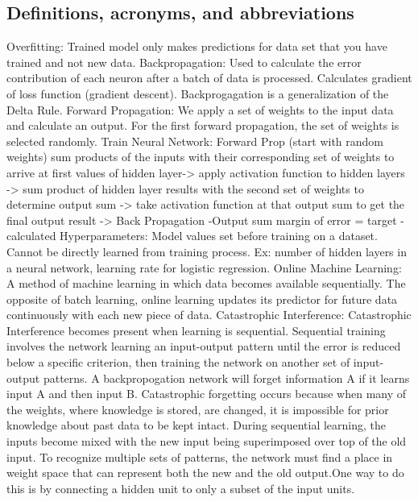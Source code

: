 \documentclass[a4paper, 10pt]{article}
\begin{document}
\subsection{Definitions, acronyms, and abbreviations}
Overfitting: Trained model only makes predictions for data set that you have trained and not new data.
\newline \newline
Backpropagation: Used to calculate the error contribution of each neuron after a batch of data is processed. Calculates gradient of loss function (gradient descent). Backprogagation is a generalization of the Delta Rule.
\newline \newline
Forward Propagation: We apply a set of weights to the input data and calculate an output. For the first forward propagation, the set of weights is selected randomly.
\newline \newline
Train Neural Network: Forward Prop (start with random weights) sum products of the inputs with their corresponding set of weights to arrive at first values of hidden layer-> apply activation function to hidden layers -> sum product of hidden layer results with the second set of weights to determine output sum -> take activation function at that output sum to get the final output result -> Back Propagation \cite{neuralnets} \newline
		-Output sum margin of error = target -calculated
\newline \newline
Hyperparameters: Model values set before training on a dataset. Cannot be directly learned from training process. Ex: number of hidden layers in a neural network, learning rate for logistic regression.
\newline \newline	
Online Machine Learning: A method of machine learning in which data becomes available sequentially. The opposite of batch learning, online learning updates its predictor for future data continuously with each new piece of data.
\newline \newline	
Catastrophic Interference: Catastrophic Interference becomes present when learning is sequential. Sequential training involves the network learning an input-output pattern until the error is reduced below a specific criterion, then training the network on another set of input-output patterns. A backpropogation network will forget information A if it learns input A and then input B. Catastrophic forgetting occurs because when many of the weights, where knowledge is stored, are changed, it is impossible for prior knowledge about past data to be kept intact. During sequential learning, the inputs become mixed with the new input being superimposed over top of the old input. To recognize multiple sets of patterns, the network must find a place in weight space that can represent both the new and the old output.One way to do this is by connecting a hidden unit to only a subset of the input units. \cite{ImgRecog}
\end{document}
